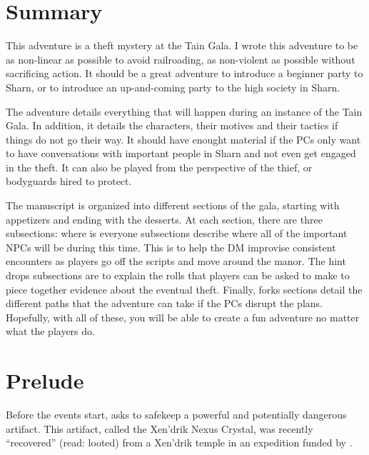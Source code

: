 \documentclass[twocolumn]{dndbook}
\begin{document}
\section{Summary}

This adventure is a theft mystery at the Tain Gala.
I wrote this adventure to be as non-linear as possible to avoid railroading,
as non-violent as possible without sacrificing action.
It should be a great adventure to introduce a beginner party to Sharn,
or to introduce an up-and-coming party to the high society in Sharn.
\par

The adventure details everything that will happen during an instance of the Tain Gala.
In addition, it details the characters, their motives and their tactics if things do not go their way.
It should have enought material if the PCs only want to have conversations with important people in Sharn and not even get engaged in the theft.
It can also be played from the perspective of the thief, or bodyguards hired to protect.\par

The manuscript is organized into different sections of the gala,
starting with appetizers and ending with the desserts.
At each section, there are three subsections:
where is everyone subsections describe where all of the important NPCs will be during this time.
This is to help the DM improvise consistent encounters as players go off the scripts and move around the manor.
The hint drops subsections are to explain the rolls that players can be asked to make to piece together evidence about the eventual theft.
Finally, forks sections detail the different paths that the adventure can take if the PCs disrupt the plans.
Hopefully, with all of these, you will be able to create a fun adventure no matter what the players do.

\section{Prelude}
Before the events start,  asks
 to safekeep a powerful and potentially
dangerous artifact. This artifact, called the Xen'drik Nexus Crystal,
was recently ``recovered'' (read: looted) from a Xen'drik temple
in an expedition funded by .\par
\end{document}
